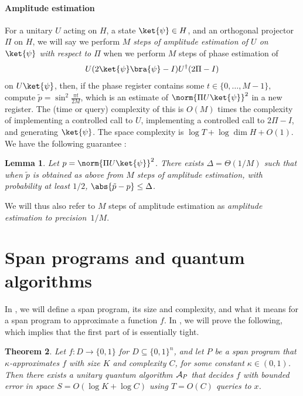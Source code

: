 \documentclass[11pt]{article}
\numberwithin{equation}{section}
\newtheorem{theorem}{Theorem}[section]
\newtheorem{lemma}[theorem]{Lemma}
\theoremstyle{definition}
\theoremstyle{plain}
\begin{document}
\paragraph{Amplitude estimation} For a unitary $U$ acting on $H$, a state $\ket{\psi}\in H$, and an orthogonal projector $\Pi$ on $H$, we will say we perform \emph{$M$ steps of amplitude estimation of $U$ on $\ket{\psi}$ with respect to $\Pi$} when we perform $M$ steps of phase estimation of 
$$U(2\ket{\psi}\bra{\psi}-I)U^\dagger (2\Pi-I)$$
on $U\ket{\psi}$, then, if the phase register contains some $t\in\{0,\dots,M-1\}$, compute $\tilde p=\sin^2\frac{\pi t}{2M}$, which is an estimate of $\norm{\Pi U\ket{\psi}}^2$ in a new register. The (time or query) complexity of this is $O(M)$ times the complexity of implementing a controlled call to $U$, implementing a controlled call to $2\Pi-I$, and generating $\ket{\psi}$. The space complexity is $\log T + \log\dim H+O(1)$. We have the following guarantee \cite{BHMT02}:
\begin{lemma}
Let $p=\norm{\Pi U\ket{\psi}}^2$. There exists $\Delta=\Theta(1/M)$ such that when $\tilde p$ is obtained as above from $M$ steps of amplitude estimation, 
with probability at least $1/2$, $\abs{\tilde p - p}\leq \Delta$. 
\end{lemma}
\noindent We will thus also refer to $M$ steps of amplitude estimation as \emph{amplitude estimation to precision~$1/M$}. 





\section{Span programs and quantum algorithms}\label{sec:span-alg}

In , we will define a span program, its size and complexity, and what it means for a span program to approximate a function $f$. In , we will prove the following, which implies that the first part of  is essentially tight. 

\begin{theorem}\label{thm:span-to-alg}
Let $f:D\rightarrow\{0,1\}$ for $D\subseteq\{0,1\}^n$, and let $P$ be a span program that $\kappa$-approximates $f$ with size $K$ and complexity $C$, for some constant $\kappa\in (0,1)$. Then there exists a unitary quantum algorithm ${\cal A}_P$ that decides $f$ with bounded error in space $S=O(\log K+\log C)$ using $T=O(C)$ queries to $x$. 
\end{theorem}
\end{document}
